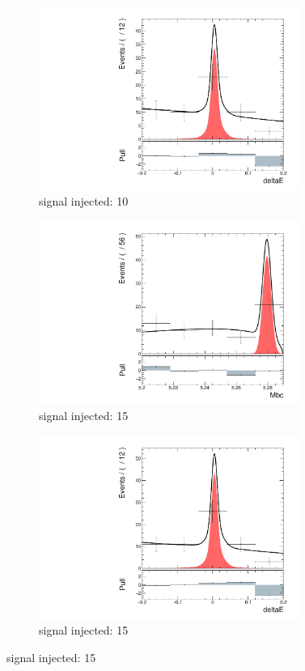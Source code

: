 \begin{figure}[htpb]
\begin{subfigure}{0.5\linewidth}
		\includegraphics[page=1,height=6cm]{figures/injection_sig_10/ds_gen_deltaE_2D.pdf}
		\caption{signal injected: 10}
	\end{subfigure}
	\begin{subfigure}{0.5\linewidth}
		\includegraphics[page=1,height=6cm]{figures/injection_sig_15/ds_gen_Mbc_2D.pdf}
		\caption{signal injected: 15}
	\end{subfigure}
	\begin{subfigure}{0.5\linewidth}
		\includegraphics[page=1,height=6cm]{figures/injection_sig_15/ds_gen_deltaE_2D.pdf}
		\caption{signal injected: 15}
	\end{subfigure}
\end{figure}

